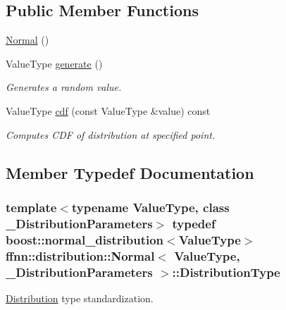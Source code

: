 \subsection*{Public Member Functions}
\begin{DoxyCompactItemize}
\item 
\hyperlink{classffnn_1_1distribution_1_1_normal_ac4fa253a18700c58490493e998539d85}{Normal} ()
\item 
Value\-Type \hyperlink{classffnn_1_1distribution_1_1_normal_a60ac62a307b2b6efd94c3b9ebc69d4eb}{generate} ()
\begin{DoxyCompactList}\small\item\em Generates a random value. \end{DoxyCompactList}\item 
Value\-Type \hyperlink{classffnn_1_1distribution_1_1_normal_ad53110a198ef0e2ed4f510abf491ae4e}{cdf} (const Value\-Type \&value) const 
\begin{DoxyCompactList}\small\item\em Computes C\-D\-F of distribution at specified point. \end{DoxyCompactList}\end{DoxyCompactItemize}


\subsection{Member Typedef Documentation}
\hypertarget{classffnn_1_1distribution_1_1_normal_ad56eafa8b2673bdb5092e47a0757e998}{
\subsubsection[{Distribution\-Type}]{\setlength{\rightskip}{0pt plus 5cm}template$<$typename Value\-Type, class \-\_\-\-Distribution\-Parameters$>$ typedef boost\-::normal\-\_\-distribution$<$Value\-Type$>$ {\bf ffnn\-::distribution\-::\-Normal}$<$ Value\-Type, \-\_\-\-Distribution\-Parameters $>$\-::{\bf Distribution\-Type}}}\label{classffnn_1_1distribution_1_1_normal_ad56eafa8b2673bdb5092e47a0757e998}


\hyperlink{classffnn_1_1distribution_1_1_distribution}{Distribution} type standardization. 

